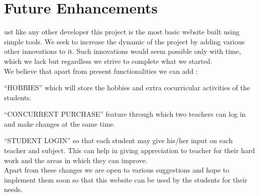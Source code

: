 \chapter{Future Enhancements}
ust like any other developer this project is the most basic website built using simple tools. We seek to increase the dynamic of the project by adding various other innovations to it. Such innovations would seem possible only with time, which we lack but regardless we strive to complete what we started.\\[0.1in]

We believe that apart from present functionalities we can add :

“HOBBIES” which will store the hobbies and extra cocurricular activities of the students.

“CONCURRENT PURCHASE” feature through which two teachers can log in and make changes at the same time.


“STUDENT LOGIN” so that each student may give his/her input on each teacher and subject. This can help in giving appreciation to teacher for their hard  work and the areas in which they can improve.\\[0.1in]


Apart from these changes we are open to various suggestions and hope to implement them soon so that this website can be used by the students for their needs.




